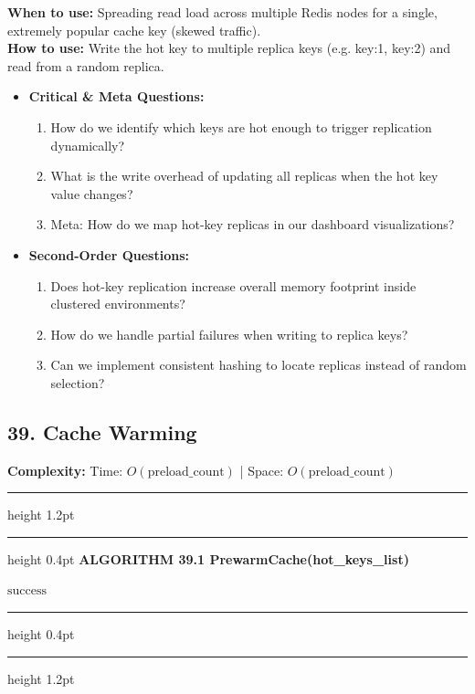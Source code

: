 \documentclass[11pt,a4paper]{article}
\newenvironment{textbookalgo}[2]{%
  \par\addvspace{1.2em}\noindent
  \hrule height 1.2pt
  \vspace{1.5pt}
  \hrule height 0.4pt
  \vspace{5pt}
  {\noindent\large\bfseries\sffamily ALGORITHM #1 \quad #2}
  \par\vspace{5pt}
  \RestyleAlgo{plain}
}{%
  \par\vspace{4pt}
  \hrule height 0.4pt
  \vspace{1.5pt}
  \hrule height 1.2pt
  \par\addvspace{1.2em}
}
\theoremstyle{definition}
\begin{document}
\noindent
\textbf{When to use:} Spreading read load across multiple Redis nodes for a single, extremely popular cache key (skewed traffic).\\
\textbf{How to use:} Write the hot key to multiple replica keys (e.g. key:1, key:2) and read from a random replica.
\begin{itemize}[leftmargin=*]
  \item[] \textbf{Critical \& Meta Questions:}
  \begin{enumerate}
    \item How do we identify which keys are hot enough to trigger replication dynamically?
    \item What is the write overhead of updating all replicas when the hot key value changes?
    \item Meta: How do we map hot-key replicas in our dashboard visualizations?
  \end{enumerate}
  \item[] \textbf{Second-Order Questions:}
  \begin{enumerate}
    \item Does hot-key replication increase overall memory footprint inside clustered environments?
    \item How do we handle partial failures when writing to replica keys?
    \item Can we implement consistent hashing to locate replicas instead of random selection?
  \end{enumerate}
\end{itemize}
\medskip


\clearpage
\subsection{39. Cache Warming}

\noindent
\textbf{Complexity:} Time: $O(\text{preload\_count})$ | Space: $O(\text{preload\_count})$
\smallskip

\begin{textbookalgo}{39.1}{PrewarmCache(hot\_keys\_list)}
\begin{algorithm}[H]
\Return $\text{success}$\;
\end{algorithm}
\end{textbookalgo}
\end{document}
